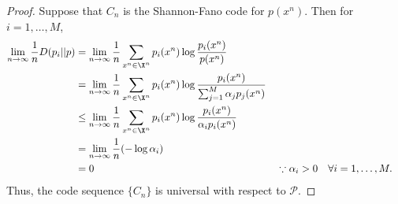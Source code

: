 \documentclass[
  coursecode={MTHE 477},
  assignmentname={Homework \homeworknumber},
  studentnumber=20053722,
  name={Bryan Hoang},
  draft,
]{
  ltxanswer%
}
\begin{document}
  \begin{questions}
    \setcounter{question}{\questionnumber}
    \addtocounter{question}{-1}
    \question[20]{}
    \begin{solution}
      \begin{proof}
        Suppose that \(C_{n}\) is the Shannon-Fano code for \(p(x^{n})\). Then for \(i = 1, \dotsc, M\),
        \begin{align*}
          \lim_{n\to\infty} \frac{1}{n} D(p_{i}||p) &= \lim_{n\to\infty} \frac{1}{n} \sum_{x^{n}\in\X^{n}} p_{i}(x^{n}) \log \frac{p_{i}(x^{n})}{p(x^{n})}                                                                                         \\
                                                    &= \lim_{n\to\infty} \frac{1}{n} \sum_{x^{n}\in\X^{n}} p_{i}(x^{n}) \log \frac{p_{i}(x^{n})}{\sum_{j=1}^{M} \alpha_{j} p_{j}(x^{n})}                                                           \\
                                                    &\le \lim_{n\to\infty} \frac{1}{n} \sum_{x^{n}\in\X^{n}} p_{i}(x^{n}) \log \frac{p_{i}(x^{n})}{\alpha_{i} p_{i}(x^{n})}                                                                        \\
                                                    &= \lim_{n\to\infty} \frac{1}{n} (-\log \alpha_{i})                                                                                                                                            \\
                                                    &= 0                                                                                                                                 & &\because \alpha_{i} > 0\quad \forall i = 1, \dotsc, M.
        \end{align*}
        Thus, the code sequence \(\{C_{n}\}\) is universal with respect to \(\mathcal{P}\).
      \end{proof}
    \end{solution}
  \end{questions}
\end{document}
